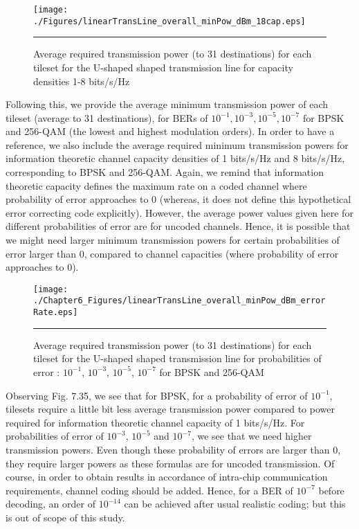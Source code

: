     
\begin{figure}[H]
  \centering
    \texttt{[image: ./Figures/linearTransLine\_overall\_minPow\_dBm\_18cap.eps]}
    \rule{35em}{0.5pt}
  \caption[Average required transmission power (to 31 destinations) for each tileset for the U-shaped shaped transmission line for capacity densities 1-8 bits/s/Hz]{Average required transmission power (to 31 destinations) for each tileset for the U-shaped shaped transmission line for capacity densities 1-8 bits/s/Hz}
  \label{fig:Electron}
\end{figure}

Following this, we provide the average minimum transmission power of each tileset (average to 31 destinations), for BERs of $10^{-1}, 10^{-3}, 10^{-5}, 10^{-7}$ for BPSK and 256-QAM (the lowest and highest modulation orders). In order to have a reference, we also include the average required minimum transmission powers for information theoretic channel capacity densities of 1 bits/s/Hz and 8 bits/s/Hz, corresponding to BPSK and 256-QAM. Again, we remind that information theoretic capacity defines the maximum rate on a coded channel where probability of error approaches to 0 (whereas, it does not define this hypothetical error correcting code explicitly). However, the average power values given here for different probabilities of error are for uncoded channels. Hence, it is possible that we might need larger minimum transmission powers for certain probabilities of error larger than 0, compared to channel capacities (where probability of error approaches to 0). 

    
\begin{figure}[H]
  \centering
    \texttt{[image: ./Chapter6\_Figures/linearTransLine\_overall\_minPow\_dBm\_errorRate.eps]}
    \rule{35em}{0.5pt}
  \caption[Average required transmission power (to 31 destinations) for each tileset for the U-shaped shaped transmission line for probabilities of error : $10^{-1}$, $10^{-3}$, $10^{-5}$, $10^{-7}$ for BPSK and 256-QAM]{Average required transmission power (to 31 destinations) for each tileset for the U-shaped shaped transmission line for probabilities of error : $10^{-1}$, $10^{-3}$, $10^{-5}$, $10^{-7}$ for BPSK and 256-QAM}
  \label{fig:Electron}
\end{figure}

Observing Fig. 7.35, we see that for BPSK, for a probability of error of $10^{-1}$, tilesets require a little bit less average transmission power compared to power required for information theoretic channel capacity of 1 bits/s/Hz. For probabilities of error of $10^{-3}$, $10^{-5}$ and $10^{-7}$, we see that we need higher transmission powers. Even though these probability of errors are larger than 0, they require larger powers as these formulas are for uncoded transmission. Of course, in order to obtain results in accordance of intra-chip communication requirements, channel coding should be added. Hence, for a BER of $10^{-7}$ before decoding, an order of $10^{-14}$ can be achieved after usual realistic coding; but this is out of scope of this study.


